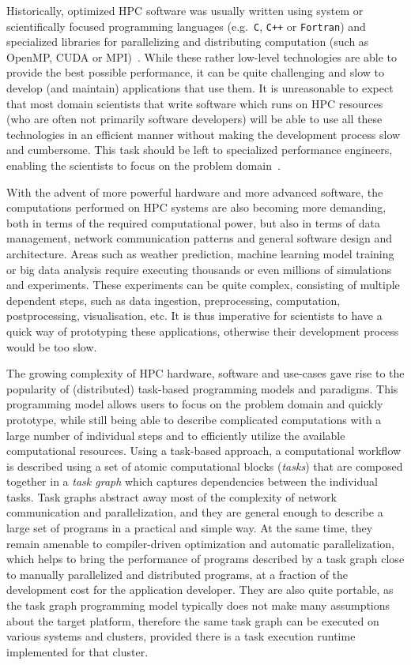 Historically, optimized HPC software was usually written using system or scientifically focused
programming languages (e.g.~\texttt{C}, \texttt{C++} or
\texttt{Fortran}) and specialized libraries for parallelizing and distributing computation
(such as OpenMP, CUDA or MPI)~\cite{mpistudy}. While these rather low-level technologies are
able to provide the best possible performance, it can be quite challenging and slow to develop (and
maintain) applications that use them. It is unreasonable to expect that most domain scientists that
write software which runs on HPC resources (who are often not primarily software developers) will
be able to use all these technologies in an efficient manner without making the development process
slow and cumbersome. This task should be left to specialized performance engineers, enabling the
scientists to focus on the problem domain~\cite{dace}.

With the advent of more powerful hardware and more advanced software, the computations performed on
HPC systems are also becoming more demanding, both in terms of the required computational power,
but also in terms of data management, network communication patterns and general software design
and architecture. Areas such as weather prediction, machine learning model training or big data
analysis require executing thousands or even millions of simulations and experiments. These
experiments can be quite complex, consisting of multiple dependent steps, such as data ingestion,
preprocessing, computation, postprocessing, visualisation, etc. It is thus imperative for
scientists to have a quick way of prototyping these applications, otherwise their development
process would be too slow.

The growing complexity of HPC hardware, software and use-cases gave rise to the popularity of
(distributed) task-based programming models and paradigms. This programming model allows users to
focus on the problem domain and quickly prototype, while still being able to describe complicated
computations with a large number of individual steps and to efficiently utilize the available
computational resources. Using a task-based approach, a computational workflow is described using a
set of atomic computational blocks (\emph{tasks}) that are composed together in a
\emph{task graph} which captures dependencies between the individual tasks. Task graphs
abstract away most of the complexity of network communication and parallelization, and they are
general enough to describe a large set of programs in a practical and simple way. At the same time,
they remain amenable to compiler-driven optimization and automatic parallelization, which helps to
bring the performance of programs described by a task graph close to manually parallelized and
distributed programs, at a fraction of the development cost for the application developer. They are
also quite portable, as the task graph programming model typically does not make many assumptions
about the target platform, therefore the same task graph can be executed on various systems and
clusters, provided there is a task execution runtime implemented for that cluster.

